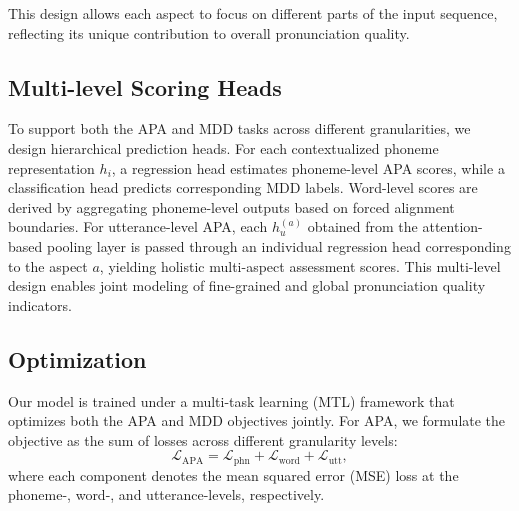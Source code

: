 \documentclass{Interspeech}
\begin{document}
This design allows each aspect to focus on different parts of the input sequence, reflecting its unique contribution to overall pronunciation quality.


\subsection{Multi-level Scoring Heads}
To support both the APA and MDD tasks across different granularities, we design hierarchical prediction heads. For each contextualized phoneme representation $h_i$, a regression head estimates phoneme-level APA scores, while a classification head predicts corresponding MDD labels. Word-level scores are derived by aggregating phoneme-level outputs based on forced alignment boundaries. For utterance-level APA, each $h_u^{(a)}$ obtained from the attention-based pooling layer is passed through an individual regression head corresponding to the aspect $a$, yielding holistic multi-aspect assessment scores. This multi-level design enables joint modeling of fine-grained and global pronunciation quality indicators.

\subsection{Optimization}
Our model is trained under a multi-task learning (MTL) framework that optimizes both the APA and MDD objectives jointly. 
For APA, we formulate the objective as the sum of losses across different granularity levels:
\begin{equation}
    \mathcal{L}_{\text{APA}} = \mathcal{L}_{\text{phn}} + \mathcal{L}_{\text{word}} + \mathcal{L}_{\text{utt}}
    \label{eq:loss_capt},
\end{equation}
where each component denotes the mean squared error (MSE) loss at the phoneme-, word-, and utterance-levels, respectively. 
\end{document}
